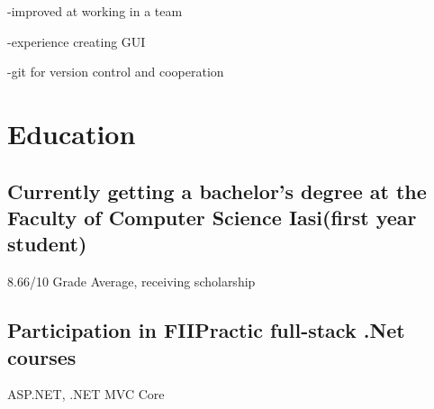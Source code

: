 \documentclass[a4paper,hidelinks,10pt]{article}
\begin{document}
-improved at working in a team

-experience creating GUI

-git for version control and cooperation

\section{Education}
\subsection{Currently getting a bachelor's degree at 
the Faculty of Computer Science Iasi(first year student)}
 8.66/10 Grade Average, receiving scholarship 

\subsection{Participation in FIIPractic full-stack .Net courses}
ASP.NET, .NET MVC Core
\end{document}
